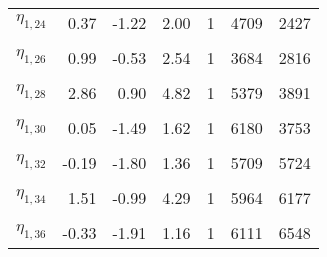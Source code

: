 \begin{longtable}[t]{lrrrrrr}
$\eta_{1, 24}$ & 0.37 & -1.22 & 2.00 & 1 & 4709 & 2427\\
\cellcolor{gray!6}{$\eta_{1, 25}$} & \cellcolor{gray!6}{1.53} & \cellcolor{gray!6}{-0.38} & \cellcolor{gray!6}{3.55} & \cellcolor{gray!6}{1} & \cellcolor{gray!6}{5926} & \cellcolor{gray!6}{3849}\\
$\eta_{1, 26}$ & 0.99 & -0.53 & 2.54 & 1 & 3684 & 2816\\
\cellcolor{gray!6}{$\eta_{1, 27}$} & \cellcolor{gray!6}{0.89} & \cellcolor{gray!6}{-0.52} & \cellcolor{gray!6}{2.28} & \cellcolor{gray!6}{1} & \cellcolor{gray!6}{5718} & \cellcolor{gray!6}{5561}\\
$\eta_{1, 28}$ & 2.86 & 0.90 & 4.82 & 1 & 5379 & 3891\\
\cellcolor{gray!6}{$\eta_{1, 29}$} & \cellcolor{gray!6}{-0.48} & \cellcolor{gray!6}{-1.75} & \cellcolor{gray!6}{0.81} & \cellcolor{gray!6}{1} & \cellcolor{gray!6}{6388} & \cellcolor{gray!6}{6400}\\
$\eta_{1, 30}$ & 0.05 & -1.49 & 1.62 & 1 & 6180 & 3753\\
\cellcolor{gray!6}{$\eta_{1, 31}$} & \cellcolor{gray!6}{1.09} & \cellcolor{gray!6}{-1.12} & \cellcolor{gray!6}{3.36} & \cellcolor{gray!6}{1} & \cellcolor{gray!6}{4454} & \cellcolor{gray!6}{2390}\\
$\eta_{1, 32}$ & -0.19 & -1.80 & 1.36 & 1 & 5709 & 5724\\
\cellcolor{gray!6}{$\eta_{1, 33}$} & \cellcolor{gray!6}{2.85} & \cellcolor{gray!6}{0.15} & \cellcolor{gray!6}{6.11} & \cellcolor{gray!6}{1} & \cellcolor{gray!6}{5190} & \cellcolor{gray!6}{5496}\\
$\eta_{1, 34}$ & 1.51 & -0.99 & 4.29 & 1 & 5964 & 6177\\
\cellcolor{gray!6}{$\eta_{1, 35}$} & \cellcolor{gray!6}{0.73} & \cellcolor{gray!6}{-0.88} & \cellcolor{gray!6}{2.49} & \cellcolor{gray!6}{1} & \cellcolor{gray!6}{5041} & \cellcolor{gray!6}{2357}\\
$\eta_{1, 36}$ & -0.33 & -1.91 & 1.16 & 1 & 6111 & 6548\\*
\end{longtable}